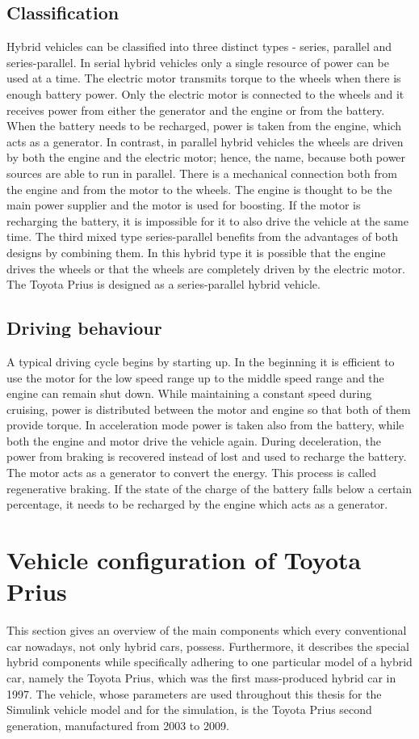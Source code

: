 \subsection{Classification}
Hybrid vehicles can be classified into three distinct types - series, parallel and series-parallel. In serial hybrid vehicles only a single resource of power can be used at a time. The electric motor transmits torque to the wheels when there is enough battery power. Only the electric motor is connected to the wheels and it receives power from either the generator and the engine or from the battery. When the battery needs to be recharged, power is taken from the engine, which acts as a generator. In contrast, in parallel hybrid vehicles the wheels are driven by both the engine and the electric motor; hence, the name, because both power sources are able to run in parallel. There is a mechanical connection both from the engine and from the motor to the wheels. The engine is thought to be the main power supplier and the motor is used for boosting. If the motor is recharging the battery, it is impossible for it to also drive the vehicle at the same time. The third mixed type series-parallel benefits from the advantages of both designs by combining them. In this hybrid type it is possible that the engine drives the wheels or that the wheels are completely driven by the electric motor. The Toyota Prius is designed as a series-parallel hybrid vehicle.

\subsection{Driving behaviour}
A typical driving cycle begins by starting up. In the beginning it is efficient to use the motor for the low speed range up to the middle speed range and the engine can remain shut down. While maintaining a constant speed during cruising, power is distributed between the motor and engine so that both of them provide torque. In acceleration mode power is taken also from the battery, while both the engine and motor drive the vehicle again. During deceleration, the power from braking is recovered instead of lost and used to recharge the battery. The motor acts as a generator to convert the energy. This process is called regenerative braking. If the state of the charge of the battery falls below a certain percentage, it needs to be recharged by the engine which acts as a generator.

\section{Vehicle configuration of Toyota Prius}
This section gives an overview of the main components which every conventional car nowadays, not only hybrid cars, possess. Furthermore, it describes the special hybrid components while specifically adhering to one particular model of a hybrid car, namely the Toyota Prius, which was the first mass-produced hybrid car in 1997. The vehicle, whose parameters are used throughout this thesis for the Simulink vehicle model and for the simulation, is the Toyota Prius second generation, manufactured from 2003 to 2009.

